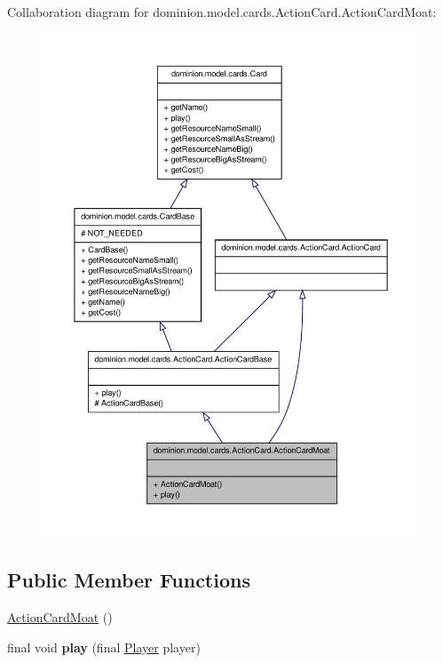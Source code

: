 \-Collaboration diagram for dominion.\-model.\-cards.\-Action\-Card.\-Action\-Card\-Moat\-:
\nopagebreak
\begin{figure}[H]
\begin{center}
\leavevmode
\includegraphics[width=350pt]{classdominion_1_1model_1_1cards_1_1ActionCard_1_1ActionCardMoat__coll__graph}
\end{center}
\end{figure}
\subsection*{\-Public \-Member \-Functions}
\begin{DoxyCompactItemize}
\item 
\hyperlink{classdominion_1_1model_1_1cards_1_1ActionCard_1_1ActionCardMoat_af6c8d85b3bf861f2d2cd3ba65eb14148}{\-Action\-Card\-Moat} ()
\item 
\hypertarget{classdominion_1_1model_1_1cards_1_1ActionCard_1_1ActionCardMoat_a641ac5427eab367cd6d1092de6aa4bff}{final void {\bfseries play} (final \hyperlink{interfacedominion_1_1model_1_1Player}{\-Player} player)}\label{classdominion_1_1model_1_1cards_1_1ActionCard_1_1ActionCardMoat_a641ac5427eab367cd6d1092de6aa4bff}

\end{DoxyCompactItemize}


